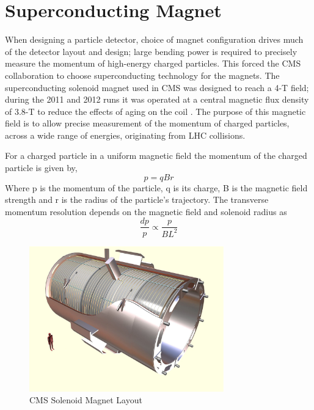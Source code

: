 \section{Superconducting Magnet}%
When designing a particle detector, choice of magnet configuration drives
much of the detector layout and design; large bending power is required to precisely 
measure the momentum of high-energy charged particles. This forced the CMS
collaboration to choose superconducting technology for the magnets.
The superconducting solenoid magnet used in CMS was designed to reach a 4-T field;
during the 2011 and 2012 runs it was operated at a central magnetic flux
density of 3.8-T to reduce the effects of aging on the coil \cite{PreciseMappings}.
The purpose of this magnetic field is to allow precise measurement of the 
momentum of charged particles, across a wide range of energies, originating from LHC collisions. 

For a charged particle in a uniform magnetic field the  momentum of the charged particle is given by,
\begin{displaymath}
p=qBr
\end{displaymath}  
Where p is the momentum of the particle, q is its charge, B is the 
magnetic field strength and r is the radius of the particle's trajectory.
The transverse momentum resolution depends on the magnetic field and
solenoid radius as
\begin{displaymath}
\frac{dp}{p}\propto\frac{p}{BL^{2}}
\end{displaymath}
\begin{figure}[hb]
  \centering
	\includegraphics[width=0.75\textwidth]{ECALimages/magnet.png}
  	\caption[CMS Solenoid Magnet Layout]
   	{CMS Solenoid Magnet Layout}
	\label{fig:magnetLayout}
\end{figure}

